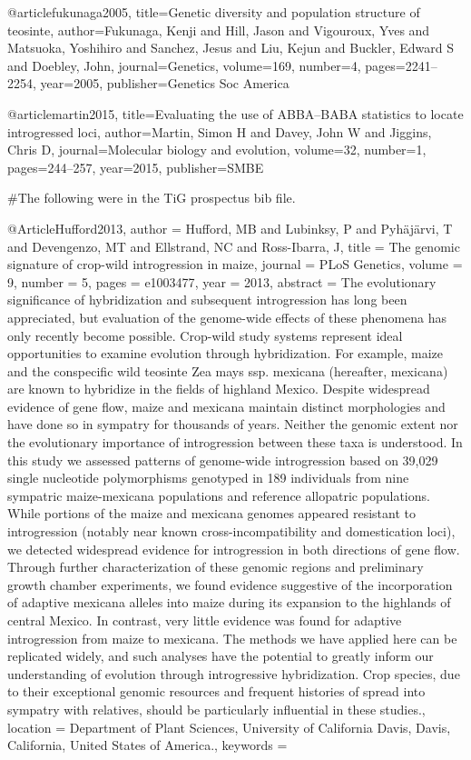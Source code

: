 @article{fukunaga2005,
  title={Genetic diversity and population structure of teosinte},
  author={Fukunaga, Kenji and Hill, Jason and Vigouroux, Yves and Matsuoka, Yoshihiro and Sanchez, Jesus and Liu, Kejun and Buckler, Edward S and Doebley, John},
  journal={Genetics},
  volume={169},
  number={4},
  pages={2241--2254},
  year={2005},
  publisher={Genetics Soc America}
}

@article{martin2015,
  title={Evaluating the use of ABBA--BABA statistics to locate introgressed loci},
  author={Martin, Simon H and Davey, John W and Jiggins, Chris D},
  journal={Molecular biology and evolution},
  volume={32},
  number={1},
  pages={244--257},
  year={2015},
  publisher={SMBE}
}

#The following were in the TiG prospectus bib file.

@Article{Hufford2013,
author = {Hufford, MB and Lubinksy, P and Pyh\"{a}j\"{a}rvi, T and Devengenzo, MT and Ellstrand, NC and Ross-Ibarra, J}, 
title = {The genomic signature of crop-wild introgression in maize}, 
journal = {PLoS Genetics}, 
volume = {9}, 
number = {5}, 
pages = {e1003477}, 
year = {2013}, 
abstract = {The evolutionary significance of hybridization and subsequent introgression has long been appreciated, but evaluation of the genome-wide effects of these phenomena has only recently become possible. Crop-wild study systems represent ideal opportunities to examine evolution through hybridization. For example, maize and the conspecific wild teosinte Zea mays ssp. mexicana (hereafter, mexicana) are known to hybridize in the fields of highland Mexico. Despite widespread evidence of gene flow, maize and mexicana maintain distinct morphologies and have done so in sympatry for thousands of years. Neither the genomic extent nor the evolutionary importance of introgression between these taxa is understood. In this study we assessed patterns of genome-wide introgression based on 39,029 single nucleotide polymorphisms genotyped in 189 individuals from nine sympatric maize-mexicana populations and reference allopatric populations. While portions of the maize and mexicana genomes appeared resistant to introgression (notably near known cross-incompatibility and domestication loci), we detected widespread evidence for introgression in both directions of gene flow. Through further characterization of these genomic regions and preliminary growth chamber experiments, we found evidence suggestive of the incorporation of adaptive mexicana alleles into maize during its expansion to the highlands of central Mexico. In contrast, very little evidence was found for adaptive introgression from maize to mexicana. The methods we have applied here can be replicated widely, and such analyses have the potential to greatly inform our understanding of evolution through introgressive hybridization. Crop species, due to their exceptional genomic resources and frequent histories of spread into sympatry with relatives, should be particularly influential in these studies.}, 
location = {Department of Plant Sciences, University of California Davis, Davis, California, United States of America.}, 
keywords = {}}

